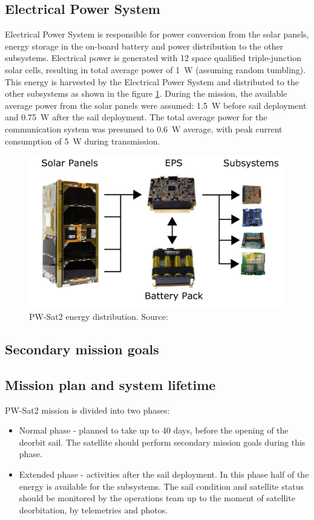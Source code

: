 \subsection{Electrical Power System}
Electrical Power System is responsible for power conversion from the solar panels, energy storage in the on-board battery and power distribution to the other subsystems. Electrical power is generated with \si{12} space qualified triple-junction solar cells, resulting in total average power of \SI{1}{\watt} (assuming random tumbling). This energy is harvested by the Electrical Power System and distributed to the other subsystems as shown in the figure \ref{pwsat_eps_distribution}. During the mission, the available average power from the solar panels were assumed: \SI{1.5}{\watt} before sail deployment and \SI{0.75}{\watt} after the sail deployment. The total average power for the communication system was presumed to \SI{0.6}{\watt} average, with peak current consumption of \SI{5}{\watt} during transmission.
\begin{figure}
    \centering
    \includegraphics[width=0.7\paperwidth]{img/1/pwsat_eps_distribution.png}
    \caption{PW-Sat2 energy distribution. Source: \cite{PW_sat2_photo}}
    \label{pwsat_eps_distribution}
\end{figure}


\subsection{Secondary mission goals}

\subsection{Mission plan and system lifetime}
PW-Sat2 mission is divided into two phases:
\begin{itemize}
    \item Normal phase - planned to take up to 40 days, before the opening of the deorbit sail. The satellite should perform secondary mission goals during this phase.
    \item Extended phase - activities after the sail deployment. In this phase half of the energy is available for the subsystems. The sail condition and satellite status should be monitored by the operations team up to the moment of satellite deorbitation, by telemetries and photos.
\end{itemize}
